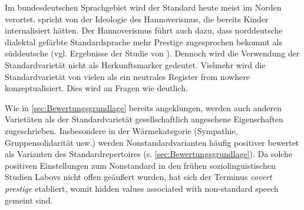 Im bundesdeutschen Sprachgebiet wird der Standard heute meist im Norden verortet.
\citet[12]{Maitz.2015} spricht von der Ideologie des Hannoverismus, die bereits Kinder internalisiert h{\"a}tten.
Der Hannoverismus f{\"u}hrt auch dazu, dass norddeutsche dialektal gef{\"a}rbte Standardsprache mehr Prestige zugesprochen bekommt als s{\"u}ddeutsche (vgl. Ergebnisse der Studie von \citealp[76--77]{Hundt.1992}). 
Dennoch wird die Verwendung der Standardvarietät nicht als Herkunftsmarker gedeutet. 
Vielmehr wird die Standardvarietät von vielen als ein neutrales Register {\glqq}from nowhere{\grqq} \citep[135]{Silverstein.2017} konzeptualisiert. 
Dies wird an Fragen wie  deutlich.

Wie in \autoref{sec:Bewertungsgrundlage} bereits angeklungen, werden auch anderen Varietäten als der Standardvarietät gesellschaftlich angesehene Eigenschaften zugeschrieben. 
Insbesondere in der Wärmekategorie (Sympathie, Gruppensolidarität usw.) werden Nonstandardvarianten häufig positiver bewertet als Varianten des Standardrepertoires (s. \autoref{sec:Bewertungsgrundlage}). %
Da solche positiven Einstellungen zum Nonstandard in den frühen soziolinguistischen Studien Labovs nicht offen geäußert wurden, hat sich der Terminus \textit{covert prestige} etabliert, womit \glqq hidden values associated with non-standard speech\grqq{} \citep[183]{Trudgill.1972} gemeint sind.

